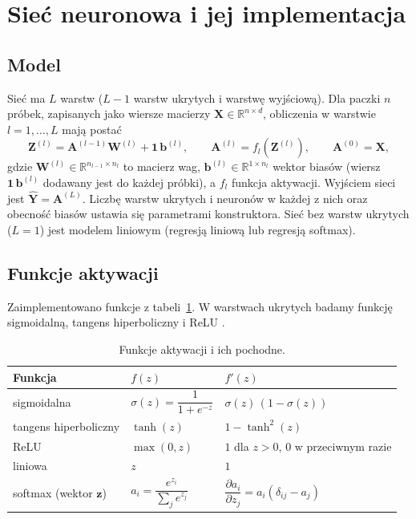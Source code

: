 \documentclass[11pt,a4paper]{article}
\newcommand{\mat}[1]{\mathbf{#1}}
\begin{document}
	\section{Sieć neuronowa i jej implementacja}
	
	\subsection{Model}
	Sieć ma $L$ warstw ($L-1$ warstw ukrytych i warstwę wyjściową). Dla paczki $n$ próbek, zapisanych jako wiersze macierzy $\mat X\in\mathbb{R}^{n\times d}$, obliczenia w warstwie $l=1,\dots,L$ mają postać
	\begin{equation}
		\mat Z^{(l)}=\mat A^{(l-1)}\mat W^{(l)}+\mat 1\,\mat b^{(l)},\qquad
		\mat A^{(l)}=f_l\!\left(\mat Z^{(l)}\right),\qquad \mat A^{(0)}=\mat X,
	\end{equation}
	gdzie $\mat W^{(l)}\in\mathbb{R}^{n_{l-1}\times n_l}$ to macierz wag, $\mat b^{(l)}\in\mathbb{R}^{1\times n_l}$ wektor biasów (wiersz $\mat 1\,\mat b^{(l)}$ dodawany jest do każdej próbki), a $f_l$ funkcja aktywacji. Wyjściem sieci jest $\hat{\mat Y}=\mat A^{(L)}$. Liczbę warstw ukrytych i neuronów w każdej z nich oraz obecność biasów ustawia się parametrami konstruktora. Sieć bez warstw ukrytych ($L=1$) jest modelem liniowym (regresją liniową lub regresją softmax).
	
	\subsection{Funkcje aktywacji}
	Zaimplementowano funkcje z tabeli~\ref{tab:act}. W warstwach ukrytych badamy funkcję sigmoidalną, tangens hiperboliczny i ReLU \cite{nair2010}.
	
	\begin{table}[H]
		\centering
		\caption{Funkcje aktywacji i ich pochodne.}\label{tab:act}
		\begin{tabular}{@{}lll@{}}
			\toprule
			Funkcja & $f(z)$ & $f'(z)$ \\
			\midrule
			sigmoidalna & $\sigma(z)=\dfrac{1}{1+e^{-z}}$ & $\sigma(z)\,(1-\sigma(z))$ \\[2mm]
			tangens hiperboliczny & $\tanh(z)$ & $1-\tanh^2(z)$ \\[1mm]
			ReLU & $\max(0,z)$ & $1$ dla $z>0$, $0$ w przeciwnym razie \\
			liniowa & $z$ & $1$ \\[1mm]
			softmax (wektor $\mat z$) & $a_i=\dfrac{e^{z_i}}{\sum_j e^{z_j}}$ & $\dfrac{\partial a_i}{\partial z_j}=a_i(\delta_{ij}-a_j)$ \\
			\bottomrule
		\end{tabular}
	\end{table}
	
\end{document}
